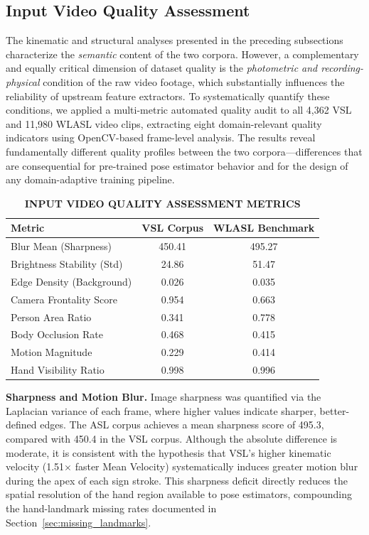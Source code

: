 \documentclass{ieeeaccess}
\begin{document}
\subsection{Input Video Quality Assessment}
\label{sec:quality_assessment}

The kinematic and structural analyses presented in the preceding subsections characterize the \textit{semantic} content of the two corpora. However, a complementary and equally critical dimension of dataset quality is the \textit{photometric and recording-physical} condition of the raw video footage, which substantially influences the reliability of upstream feature extractors. To systematically quantify these conditions, we applied a multi-metric automated quality audit to all 4,362 VSL and 11,980 WLASL video clips, extracting eight domain-relevant quality indicators using OpenCV-based frame-level analysis. The results reveal fundamentally different quality profiles between the two corpora—differences that are consequential for pre-trained pose estimator behavior and for the design of any domain-adaptive training pipeline.

\begin{table}[htbp]
\caption{\textbf{INPUT VIDEO QUALITY ASSESSMENT METRICS}}
\centering
\setlength{\tabcolsep}{3pt}
\begin{tabular}{|l|c|c|}
\hline
\textbf{Metric} & \textbf{VSL Corpus} & \textbf{WLASL Benchmark} \\
\hline
Blur Mean (Sharpness) & 450.41 & 495.27 \\
Brightness Stability (Std) & 24.86 & 51.47 \\
Edge Density (Background) & 0.026 & 0.035 \\
Camera Frontality Score & 0.954 & 0.663 \\
Person Area Ratio & 0.341 & 0.778 \\
Body Occlusion Rate & 0.468 & 0.415 \\
Motion Magnitude & 0.229 & 0.414 \\
Hand Visibility Ratio & 0.998 & 0.996 \\
\hline
\end{tabular}
\label{tab:quality}
\end{table}

\textbf{Sharpness and Motion Blur.} Image sharpness was quantified via the Laplacian variance of each frame, where higher values indicate sharper, better-defined edges. The ASL corpus achieves a mean sharpness score of 495.3, compared with 450.4 in the VSL corpus. Although the absolute difference is moderate, it is consistent with the hypothesis that VSL's higher kinematic velocity (1.51$\times$ faster Mean Velocity) systematically induces greater motion blur during the apex of each sign stroke. This sharpness deficit directly reduces the spatial resolution of the hand region available to pose estimators, compounding the hand-landmark missing rates documented in Section~\ref{sec:missing_landmarks}.
\end{document}
